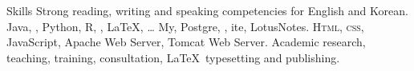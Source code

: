 
\begin{rubric}{Skills}
\entry*[Languages]
	Strong reading, writing and speaking competencies for English and Korean.
	Java, , Python, R, , \LaTeX, \ldots
\entry*[Databases]
	My, Postgre, , ite, LotusNotes.
	\textsc{Html, css}, JavaScript, Apache Web Server, Tomcat Web Server.
\entry*[Misc.]
	Academic research, teaching, training, consultation, \LaTeX\ typesetting and publishing.
\end{rubric}
